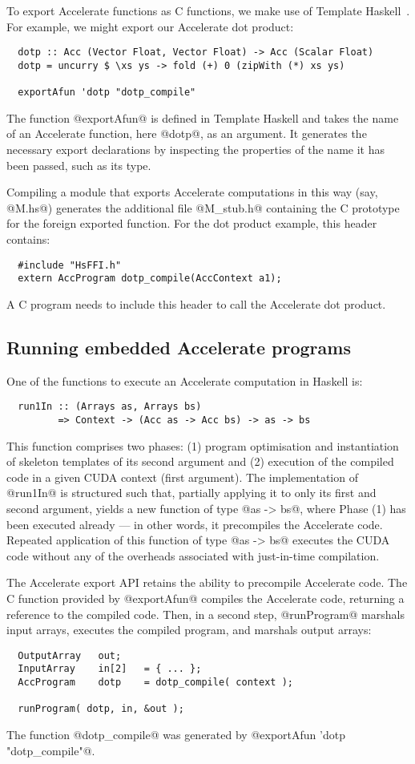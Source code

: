 To export Accelerate functions as C functions, we make use of Template Haskell~\cite{Sheard:2002template}. For example, we might export our Accelerate dot product:
%
{\small
\begin{lstlisting}
  dotp :: Acc (Vector Float, Vector Float) -> Acc (Scalar Float)
  dotp = uncurry $ \xs ys -> fold (+) 0 (zipWith (*) xs ys)

  exportAfun 'dotp "dotp_compile"
\end{lstlisting}
}\noindent%
%
The function @exportAfun@ is defined in Template Haskell and takes the name of an Accelerate function, here @dotp@, as an argument. It generates the necessary export declarations by inspecting the properties of the name it has been passed, such as its type.

Compiling a module that exports Accelerate computations in this way (say,
@M.hs@) generates the additional file @M_stub.h@ containing the C prototype for
the foreign exported function. For the dot product example, this header contains:
%
{\small
\begin{lstlisting}
  #include "HsFFI.h"
  extern AccProgram dotp_compile(AccContext a1);
\end{lstlisting}
}\noindent%
%
A C program needs to include this header to call the Accelerate dot product.


\subsection{Running embedded Accelerate programs}

One of the functions to execute an Accelerate computation in Haskell is:
%
{\small
\begin{lstlisting}
  run1In :: (Arrays as, Arrays bs)
         => Context -> (Acc as -> Acc bs) -> as -> bs
\end{lstlisting}
}\noindent%
%
This function comprises two phases: (1) program optimisation and instantiation of skeleton templates of its second argument and (2) execution of the compiled code in a given CUDA context (first argument). The implementation of @run1In@ is structured such that, partially applying it to only its first and second argument, yields a new function of type @as -> bs@, where Phase (1) has been executed already --- in other words, it precompiles the Accelerate code. Repeated application of this function of type @as -> bs@ executes the CUDA code without any of the overheads associated with just-in-time compilation.

The Accelerate export API retains the ability to precompile Accelerate code. The C function provided by @exportAfun@ compiles the Accelerate code, returning a reference to the compiled code. Then, in a second step, @runProgram@ marshals input arrays, executes the compiled program, and marshals output arrays:
%
{\small
\begin{lstlisting}
  OutputArray   out;
  InputArray    in[2]   = { ... };
  AccProgram    dotp    = dotp_compile( context );

  runProgram( dotp, in, &out );
\end{lstlisting}
}\noindent%
%
The function @dotp_compile@ was generated by @exportAfun 'dotp "dotp_compile"@.

